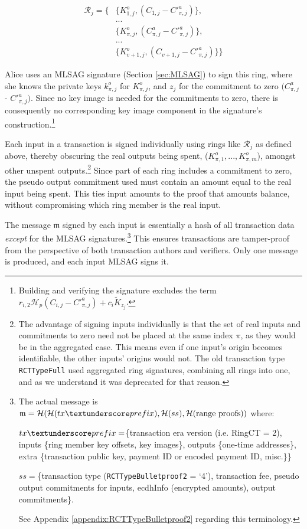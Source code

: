 \begin{align*}
    \mathcal{R}_j = \{&\{K^o_{1, j}, (C_{1, j} - C'^a_{\pi, j})\}, \\
    &... \\
    &\{ K^o_{\pi, j}, (C^a_{\pi, j} - C'^a_{\pi, j})\}, \\
    &... \\
    &\{ K^o_{v+1, j}, (C_{v+1, j} - C'^a_{\pi, j})\}\}
\end{align*}

Alice uses an MLSAG signature (Section \ref{sec:MLSAG}) to sign this ring, where she knows the private keys $k^o_{\pi,j}$ for $K^o_{\pi,j}$, and $z_j$ for the commitment to zero $(C^a_{\pi,j}$ - $C'^a_{\pi,j})$. Since no key image is needed for the commitments to zero, there is consequently no corresponding key image component in the signature’s construction.\footnote{Building and verifying the signature excludes the term $r_{i,2} \mathcal{H}_p(C_{i, j} - C'^a_{\pi, j}) + c_i \tilde{K}_{z_j}$.}

Each input in a transaction is signed individually using rings like \(\mathcal{R}_j\) as defined above, thereby obscuring the real outputs being spent, ($K^o_{\pi,1},...,K^o_{\pi,m}$), amongst other unspent outputs.\footnote{The advantage of signing inputs individually is that the set of real inputs and commitments to zero need not be placed at the same index $\pi$, as they would be in the aggregated case. This means even if one input's origin becomes identifiable, the other inputs' origins would not. The old transaction type {\tt RCTTypeFull} used aggregated ring signatures, combining all rings into one, and as we understand it was deprecated for that reason.} Since part of each ring includes a commitment to zero, the pseudo output commitment used must contain an amount equal to the real input being spent. This ties input amounts to the proof that amounts balance, without compromising which ring member is the real input.

The message $\mathfrak{m}$ signed by each input is essentially a hash of all transaction data {\em except} for the MLSAG signatures.\footnote{The actual message is $\mathfrak{m} = \mathcal{H}(\mathcal{H}(tx\textunderscore prefix),\mathcal{H}(ss),\mathcal{H}(\text{range proofs}))$ where:\par
$tx\textunderscore prefix = $\{transaction era version (i.e. RingCT = 2), inputs \{ring member key offsets, key images\}, outputs \{one-time addresses\}, extra \{transaction public key, payment ID or encoded payment ID, misc.\}\}\par
$ss = $\{transaction type ({\tt RCTTypeBulletproof2} = `4'), transaction fee, pseudo output commitments for inputs, ecdhInfo (encrypted amounts), output commitments\}.\par
See Appendix \ref{appendix:RCTTypeBulletproof2} regarding this terminology.} This ensures transactions are tamper-proof from the perspective of both transaction authors and verifiers. Only one message is produced, and each input MLSAG signs it.


